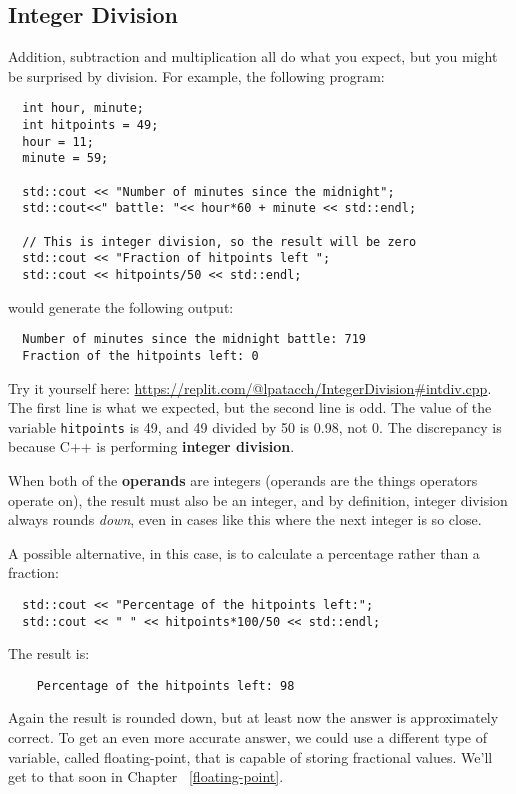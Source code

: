 \subsection{Integer Division}
Addition, subtraction and multiplication all do what you
expect, but you might be surprised by division.  For example,
the following program:

\begin{lstlisting}
  int hour, minute;
  int hitpoints = 49;
  hour = 11;
  minute = 59;
  
  std::cout << "Number of minutes since the midnight";
  std::cout<<" battle: "<< hour*60 + minute << std::endl;

  // This is integer division, so the result will be zero
  std::cout << "Fraction of hitpoints left ";
  std::cout << hitpoints/50 << std::endl;
\end{lstlisting}
%

would generate the following output:

\begin{verbatim}
  Number of minutes since the midnight battle: 719
  Fraction of the hitpoints left: 0
\end{verbatim}
%
Try it yourself here: \url{https://replit.com/@lpatacch/IntegerDivision#intdiv.cpp}.
The first line is what we expected, but the second line is
odd.  The value of the variable {\tt hitpoints} is 49, and
49 divided by 50 is 0.98, not 0.  The discrepancy is because
C++ is performing {\bf integer division}.


When both of the {\bf operands} are integers (operands are the things
operators operate on), the result must also be an integer,
and by definition, integer division always rounds {\em down},
even in cases like this where the next integer is so close.

A possible alternative, in this case, is to calculate a percentage
rather than a fraction:

\begin{lstlisting}
  std::cout << "Percentage of the hitpoints left:";
  std::cout << " " << hitpoints*100/50 << std::endl;
\end{lstlisting}

%
The result is:

\begin{verbatim}
    Percentage of the hitpoints left: 98
\end{verbatim}
%
Again the result is rounded down, but at least now the answer
is approximately correct.  To get an even more accurate
answer, we could use a different type of variable, called
floating-point, that is capable of storing fractional values.
We'll get to that soon in Chapter ~\ref{floating-point}.

